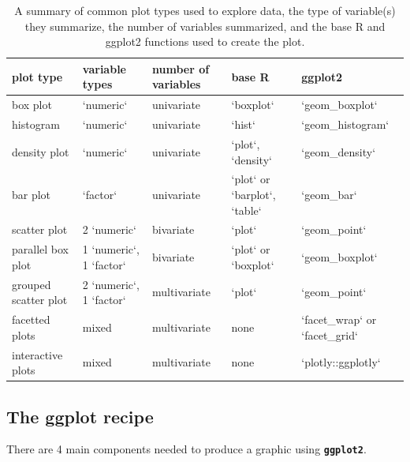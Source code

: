 \documentclass[
]{book}
\theoremstyle{definition}
\theoremstyle{definition}
\theoremstyle{definition}
\theoremstyle{definition}
\theoremstyle{remark}
\begin{document}
\begin{table}

\caption{\label{tab:viz-sum}A summary of common plot types used to explore data, the type of variable(s) they summarize, the number of variables summarized, and the base R and ggplot2 functions used to create the plot.}
\centering
\begin{tabular}[t]{lllll}
\toprule
plot type & variable types & number of variables & base R & ggplot2\\
\midrule
box plot & `numeric` & univariate & `boxplot` & `geom\_boxplot`\\
histogram & `numeric` & univariate & `hist` & `geom\_histogram`\\
density plot & `numeric` & univariate & `plot`, `density` & `geom\_density`\\
bar plot & `factor` & univariate & `plot` or `barplot`, `table` & `geom\_bar`\\
scatter plot & 2 `numeric` & bivariate & `plot` & `geom\_point`\\
\addlinespace
parallel box plot & 1 `numeric`, 1 `factor` & bivariate & `plot` or `boxplot` & `geom\_boxplot`\\
grouped scatter plot & 2 `numeric`, 1 `factor` & multivariate & `plot` & `geom\_point`\\
facetted plots & mixed & multivariate & none & `facet\_wrap` or `facet\_grid`\\
interactive plots & mixed & multivariate & none & `plotly::ggplotly`\\
\bottomrule
\end{tabular}
\end{table}

\hypertarget{the-ggplot-recipe}{%
\subsection{The ggplot recipe}\label{the-ggplot-recipe}}

There are 4 main components needed to produce a graphic using \textbf{\texttt{ggplot2}}.
\end{document}

